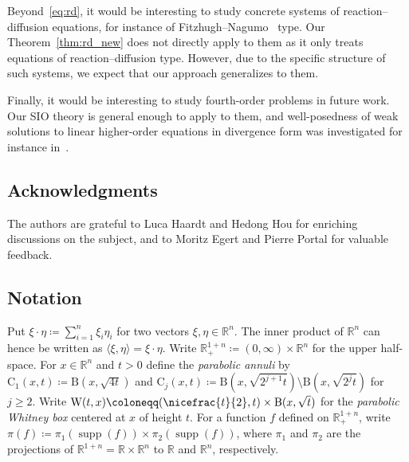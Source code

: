 \documentclass[11pt, leqno]{amsart}
\theoremstyle{definition}
\newcommand{\R}{\mathbb{R}}
\newcommand{\ann}{\mathrm{C}}
\newcommand{\WB}{\mathrm{W}}
\newcommand{\B}{\mathrm{B}}
\DeclareMathOperator{\supp}{supp}
\begin{document}
	Beyond~\eqref{eq:rd}, it would be interesting to study concrete systems of reaction--diffusion equations, for instance of Fitzhugh--Nagumo~\cite{Fitzhugh,Nagumo} type. Our Theorem~\ref{thm:rd_new} does not directly apply to them as it only treats equations of reaction--diffusion type. However, due to the specific structure of such systems, we expect that our approach generalizes to them.

	Finally, it would be interesting to study fourth-order problems in future work. Our SIO theory is general enough to apply to them, and well-posedness of weak solutions to linear higher-order equations in divergence form was investigated for instance in~\cite{Zaton}.



	\subsection*{Acknowledgments}

	The authors are grateful to Luca Haardt and Hedong Hou for enriching discussions on the subject, and to Moritz Egert and Pierre Portal for valuable feedback.

	\subsection*{Notation}

	Put $\xi \cdot \eta \coloneqq \sum_{i=1}^n \xi_i \eta_i$ for two vectors $\xi, \eta \in \R^n$. The inner product of $\R^n$ can hence be written as $\langle \xi, \eta \rangle = \xi \cdot \eta$.
	Write $\R^{1+n}_+ \coloneqq (0,\infty) \times \R^n$ for the upper half-space.
	For $x\in \R^n$ and $t > 0$ define the \emph{parabolic annuli} by $\ann_1(x,t) \coloneqq \B(x,\sqrt{4t})$ and $\ann_j(x,t) \coloneqq \B(x, \sqrt{2^{j+1} t}) \setminus \B(x, \sqrt{2^j t})$ for $j \geq 2$.
	Write $\WB(t,x) \coloneqq (\nicefrac{t}{2}, t) \times \B(x, \sqrt{t})$ for the \emph{parabolic Whitney box} centered at $x$ of height $t$.
	For a function $f$ defined on $\R^{1+n}_+$, write $\pi(f) \coloneqq \pi_1(\supp(f)) \times \pi_2(\supp(f))$, where $\pi_1$ and $\pi_2$ are the projections of $\R^{1+n} = \R \times \R^n$ to $\R$ and $\R^n$, respectively.
\end{document}
